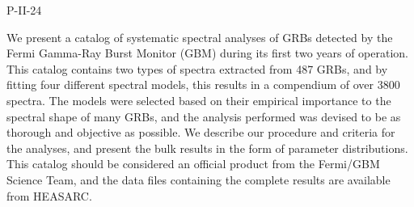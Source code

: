 P-II-24


\bigskip



\bigskip

\noindent We present a catalog of systematic spectral analyses of GRBs detected by the Fermi Gamma-Ray Burst Monitor (GBM) during its first two years of operation. This catalog contains two types of spectra extracted from 487 GRBs, and by fitting four different spectral models, this results in a compendium of over 3800 spectra. The models were selected based on their empirical importance to the spectral shape of many GRBs, and the analysis performed was devised to be as thorough and objective as possible. We describe our procedure and criteria for the analyses, and present the bulk results in the form of parameter distributions. This catalog should be considered an official product from the Fermi/GBM Science Team, and the data files containing the complete results are available from  HEASARC.
